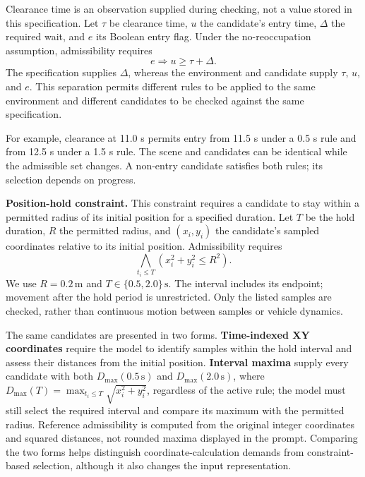 Clearance time is an observation supplied during checking, not a value stored
in this specification. Let $\tau$ be clearance time, $u$ the candidate's entry
time, $\Delta$ the required wait, and $e$ its Boolean entry flag. Under the
no-reoccupation assumption, admissibility requires
\begin{equation}\label{eq:method-entry}
e\Rightarrow u\ge\tau+\Delta.
\end{equation}
The specification supplies $\Delta$, whereas the environment and candidate
supply $\tau$, $u$, and $e$. This separation permits different rules to be
applied to the same environment and different candidates to be checked against
the same specification.

For example, clearance at 11.0 s permits entry from 11.5 s under a 0.5 s rule
and from 12.5 s under a 1.5 s rule. The scene and candidates can be identical
while the admissible set changes. A non-entry candidate satisfies both rules;
its selection depends on progress.

\noindent\textbf{Position-hold constraint.}
This constraint requires a candidate to stay within a permitted radius of its
initial position for a specified duration. Let $T$ be the hold duration, $R$
the permitted radius, and $(x_i,y_i)$ the candidate's sampled coordinates
relative to its initial position. Admissibility requires
\begin{equation}\label{eq:method-hold}
\bigwedge_{t_i\le T}\left(x_i^2+y_i^2\le R^2\right).
\end{equation}
We use $R=0.2\,\mathrm{m}$ and $T\in\{0.5,2.0\}\,\mathrm{s}$. The interval
includes its endpoint; movement after the hold period is unrestricted. Only
the listed samples are checked, rather than continuous motion between samples
or vehicle dynamics.

The same candidates are presented in two forms. \textbf{Time-indexed XY
coordinates} require the model to identify samples within the hold interval
and assess their distances from the initial position. \textbf{Interval maxima}
supply every candidate with both $D_{\max}(0.5\,\mathrm{s})$ and
$D_{\max}(2.0\,\mathrm{s})$, where
$D_{\max}(T)=\max_{t_i\le T}\sqrt{x_i^2+y_i^2}$, regardless of the active
rule; the model must still select the required interval and compare its
maximum with the permitted radius. Reference admissibility is computed from
the original integer coordinates and squared distances, not rounded maxima
displayed in the prompt. Comparing the two forms helps distinguish
coordinate-calculation demands from constraint-based selection, although it
also changes the input representation.

